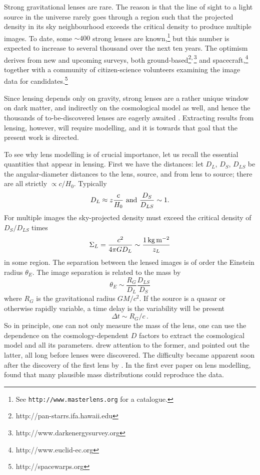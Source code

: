 \documentclass[galley,usenatbib]{mn2e}
\begin{document}
Strong gravitational lenses are rare.  The reason is that the line of
sight to a light source in the universe rarely goes through a region
such that the projected density in its sky neighbourhood exceeds the
critical density to produce multiple images.  To date, some $\sim400$
strong lenses are known,\footnote{See {\tt http://www.masterlens.org}
  for a catalogue.}  but this number is expected to increase to
several thousand over the next ten years.  The optimism derives from
new and upcoming surveys, both
ground-based\footnote{http://pan-starrs.ifa.hawaii.edu}$^{\rm,}$\footnote{http://www.darkenergysurvey.org}
and spacecraft,\footnote{http://www.euclid-ec.org} together with a
community of citizen-science volunteers examining the image data for
candidates.\footnote{http://spacewarps.org}

Since lensing depends only on gravity, strong lenses are a rather
unique window on dark matter, and indirectly on the cosmological model
as well, and hence the thousands of to-be-discovered lenses are
eagerly awaited \citep{2010CQGra..27w3001B,2012arXiv1206.1225A}.
Extracting results from lensing, however, will require modelling, and
it is towards that goal that the present work is directed.

To see why lens modelling is of crucial importance, let us recall the
essential quantities that appear in lensing.  First we have the
distances: let $D_L$, $D_S$, $D_{LS}$ be the angular-diameter
distances to the lens, source, and from lens to source; there are all
strictly $\propto c/H_0$.  Typically
\begin{equation}
D_L \approx z \frac c{H_0}\ \hbox{and}\ \frac{D_S}{D_{LS}} \sim 1.
\end{equation}
For multiple images the sky-projected density must exceed the critical
density of $D_S/D_{LS}$ times
\begin{equation}
\Sigma_L = \frac{c^2}{4\pi G D_L} \sim \frac{1\rm\,kg\,m^{-2}}{z_L}
\end{equation}
in some region.  The separation between the lensed images is of order
the Einstein radius $\theta_E$.  The image separation is related to
the mass by
\begin{equation}
\theta_E \sim \frac{R_G}{D_L} \frac{D_{LS}}{D_S}
\end{equation}
where $R_G$ is the gravitational radius $GM/c^2$.  If the source is a
quasar or otherwise rapidly variable, a time delay is the variability
will be present
\begin{equation}
\Delta t \sim R_G/c \,.
\end{equation}
So in principle, one can not only measure the mass of the lens, one
can use the dependence on the cosmology-dependent $D$ factors to
extract the cosmological model and all its parameters.
\cite{1937ApJ....86..217Z} drew attention to the former, and
\cite{1964MNRAS.128..307R,1966MNRAS.132..101R} pointed out the latter,
all long before lenses were discovered.  The difficulty became
apparent soon after the discovery of the first lens by
\cite{1979Natur.279..381W}.  In the first ever paper on lens
modelling, \cite{1981ApJ...244..736Y} found that many plausible mass
distributions could reproduce the data.
\end{document}
